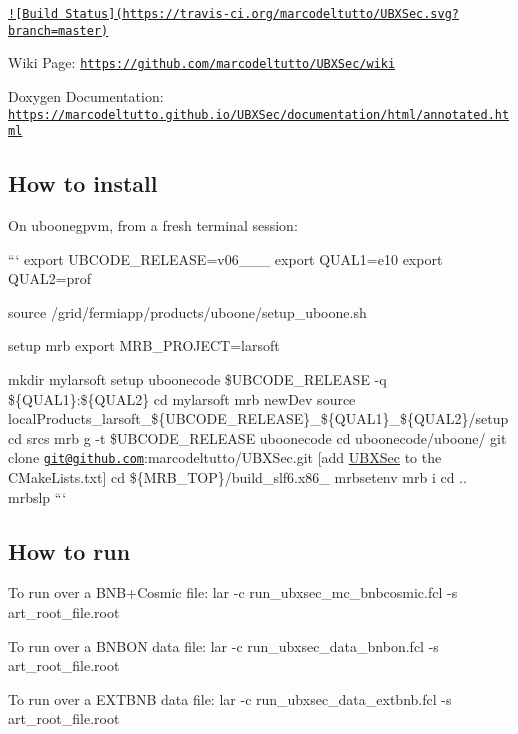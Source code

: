 \href{https://travis-ci.org/marcodeltutto/UBXSec}{\tt !\mbox{[}Build Status\mbox{]}(https\-://travis-\/ci.\-org/marcodeltutto/\-U\-B\-X\-Sec.\-svg?branch=master)}

Wiki Page\-: \href{https://github.com/marcodeltutto/UBXSec/wiki}{\tt https\-://github.\-com/marcodeltutto/\-U\-B\-X\-Sec/wiki}

Doxygen Documentation\-: \href{https://marcodeltutto.github.io/UBXSec/documentation/html/annotated.html}{\tt https\-://marcodeltutto.\-github.\-io/\-U\-B\-X\-Sec/documentation/html/annotated.\-html}

\subsection*{How to install}

On uboonegpvm, from a fresh terminal session\-:

``` export U\-B\-C\-O\-D\-E\-\_\-\-R\-E\-L\-E\-A\-S\-E=v06\-\_\-\_\-\_ export Q\-U\-A\-L1=e10 export Q\-U\-A\-L2=prof

source /grid/fermiapp/products/uboone/setup\-\_\-uboone.sh

setup mrb export M\-R\-B\-\_\-\-P\-R\-O\-J\-E\-C\-T=larsoft

mkdir mylarsoft setup uboonecode \$\-U\-B\-C\-O\-D\-E\-\_\-\-R\-E\-L\-E\-A\-S\-E -\/q \$\{Q\-U\-A\-L1\}\-:\$\{Q\-U\-A\-L2\} cd mylarsoft mrb new\-Dev source local\-Products\-\_\-larsoft\-\_\-\$\{U\-B\-C\-O\-D\-E\-\_\-\-R\-E\-L\-E\-A\-S\-E\}\-\_\-\$\{Q\-U\-A\-L1\}\-\_\-\$\{Q\-U\-A\-L2\}/setup cd srcs mrb g -\/t \$\-U\-B\-C\-O\-D\-E\-\_\-\-R\-E\-L\-E\-A\-S\-E uboonecode cd uboonecode/uboone/ git clone \href{mailto:git@github.com}{\tt git@github.\-com}\-:marcodeltutto/\-U\-B\-X\-Sec.\-git \mbox{[}add \hyperlink{classUBXSec}{U\-B\-X\-Sec} to the C\-Make\-Lists.\-txt\mbox{]} cd \$\{M\-R\-B\-\_\-\-T\-O\-P\}/build\-\_\-slf6.x86\-\_ mrbsetenv mrb i cd .. mrbslp ```

\subsection*{How to run}

To run over a B\-N\-B+\-Cosmic file\-: {\ttfamily lar -\/c run\-\_\-ubxsec\-\_\-mc\-\_\-bnbcosmic.\-fcl -\/s art\-\_\-root\-\_\-file.\-root}

To run over a B\-N\-B\-O\-N data file\-: {\ttfamily lar -\/c run\-\_\-ubxsec\-\_\-data\-\_\-bnbon.\-fcl -\/s art\-\_\-root\-\_\-file.\-root}

To run over a E\-X\-T\-B\-N\-B data file\-: {\ttfamily lar -\/c run\-\_\-ubxsec\-\_\-data\-\_\-extbnb.\-fcl -\/s art\-\_\-root\-\_\-file.\-root} 